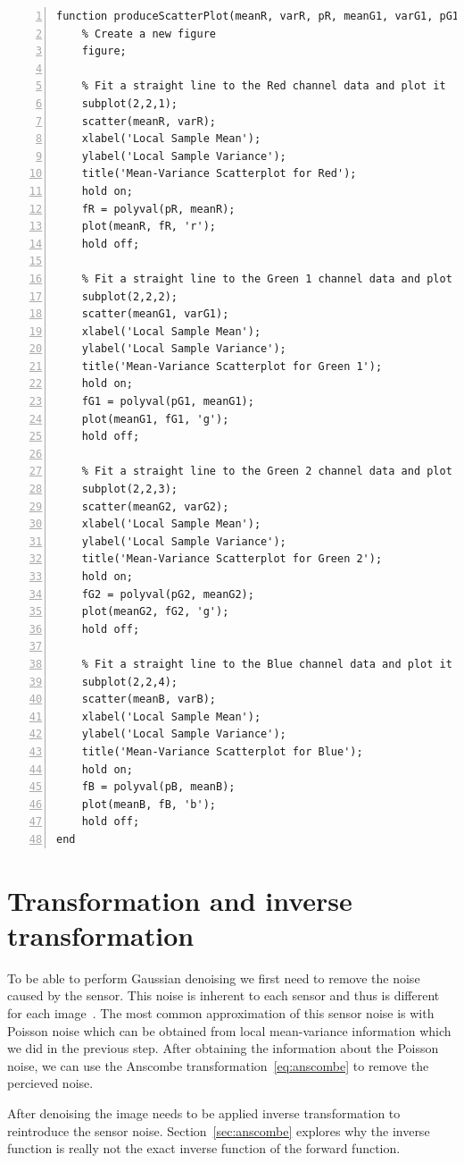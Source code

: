 \documentclass[12pt,a4paper,english
]{tunithesis}
\begin{document}
\begin{lstlisting}[style=Matlab-editor, numbers=left, basicstyle=\footnotesize]
function produceScatterPlot(meanR, varR, pR, meanG1, varG1, pG1, meanG2, varG2, pG2, meanB, varB, pB)
    % Create a new figure
    figure;
    
    % Fit a straight line to the Red channel data and plot it
    subplot(2,2,1);
    scatter(meanR, varR);
    xlabel('Local Sample Mean');
    ylabel('Local Sample Variance');
    title('Mean-Variance Scatterplot for Red');
    hold on;
    fR = polyval(pR, meanR);
    plot(meanR, fR, 'r');
    hold off;
    
    % Fit a straight line to the Green 1 channel data and plot it
    subplot(2,2,2);
    scatter(meanG1, varG1);
    xlabel('Local Sample Mean');
    ylabel('Local Sample Variance');
    title('Mean-Variance Scatterplot for Green 1');
    hold on;
    fG1 = polyval(pG1, meanG1);
    plot(meanG1, fG1, 'g');
    hold off;

    % Fit a straight line to the Green 2 channel data and plot it
    subplot(2,2,3);
    scatter(meanG2, varG2);
    xlabel('Local Sample Mean');
    ylabel('Local Sample Variance');
    title('Mean-Variance Scatterplot for Green 2');
    hold on;
    fG2 = polyval(pG2, meanG2);
    plot(meanG2, fG2, 'g');
    hold off;
    
    % Fit a straight line to the Blue channel data and plot it
    subplot(2,2,4);
    scatter(meanB, varB);
    xlabel('Local Sample Mean');
    ylabel('Local Sample Variance');
    title('Mean-Variance Scatterplot for Blue');
    hold on;
    fB = polyval(pB, meanB);
    plot(meanB, fB, 'b');
    hold off;
end
\end{lstlisting}

\section{Transformation and inverse transformation}
To be able to perform Gaussian denoising we first need to remove the noise caused by the sensor. This noise is inherent to each sensor and thus is different for each image~\cite{poissonnoise2011}. The most common approximation of this sensor noise is with Poisson noise which can be obtained from local mean-variance information which we did in the previous step. After obtaining the information about the Poisson noise, we can use the Anscombe transformation~\ref{eq:anscombe} to remove the percieved noise.

After denoising the image needs to be applied inverse transformation to reintroduce the sensor noise. Section~\ref{sec:anscombe} explores why the inverse function is really not the exact inverse function of the forward function.
\end{document}
